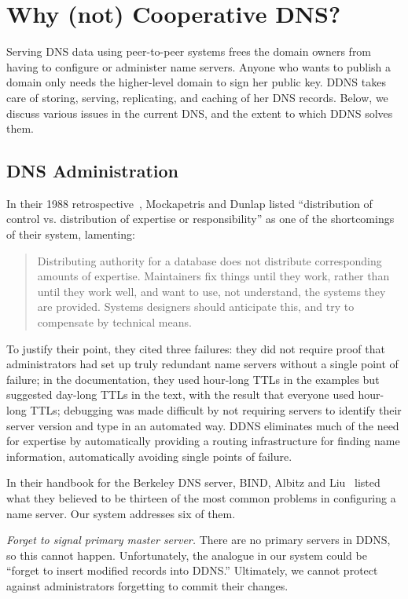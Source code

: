 \section{Why (not) Cooperative DNS?}

Serving DNS data using peer-to-peer systems 
frees the domain owners from having to configure
or administer name servers. Anyone who 
wants to publish a domain only needs the higher-level
domain to sign her public key. DDNS takes care of
storing, serving, replicating, and caching of her DNS records.
Below, we discuss various issues in the current DNS, 
and the extent to which DDNS solves them.

\subsection{DNS Administration}

In their 1988 retrospective~\cite{dns}, Mockapetris and Dunlap
listed ``distribution of control vs. distribution of expertise
or responsibility'' as one of the shortcomings of their system,
lamenting:
\begin{quote}
Distributing authority for a database does not distribute
corresponding amounts of expertise.  Maintainers fix things
until they work, rather than until they work well, and want to use,
not understand, the systems they are provided.
Systems designers should anticipate this, and try to
compensate by technical means.
\end{quote}
To justify their point, they cited three failures:
they did not require proof that administrators had set up
truly redundant name servers without a single point of failure;
in the documentation, they used hour-long TTLs 
in the examples but suggested
day-long TTLs in the text, with the result that everyone used
hour-long TTLs; debugging was made difficult by not requiring
servers to identify their server version and type in an automated way.
DDNS eliminates much of the need for expertise by 
automatically providing a routing infrastructure for finding 
name information, automatically avoiding single points of 
failure.

In their handbook for the Berkeley DNS server, BIND,
Albitz and Liu~\cite{dns-bind} listed what they believed to be
thirteen of the most common problems in configuring
a name server.
Our system addresses six of them.

{\em Forget to signal primary master server.}
There are no primary servers in DDNS, so this cannot happen.
Unfortunately, the analogue in our system could be ``forget to
insert modified records into DDNS.''
Ultimately, we cannot protect against administrators
forgetting to commit their changes.

